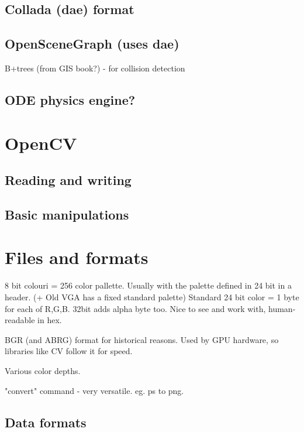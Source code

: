 \documentclass[oneside,english]{scrbook}
\begin{document}
\section{Collada (dae) format}


\section{OpenSceneGraph (uses dae)}
B+trees (from GIS book?) - for collision detection

\section{ODE physics engine?}

\chapter{OpenCV}


\section{Reading and writing}




\section{Basic manipulations}


\chapter{Files and formats}

8 bit colouri = 256 color pallette. Usually with the palette defined in 24 bit in a header. (+ Old VGA has a fixed standard palette)
Standard 24 bit color = 1 byte for each of R,G,B. 32bit adds alpha byte too.  Nice to see and work with, human-readable in hex.

BGR (and ABRG) format for historical reasons. Used by GPU hardware, so libraries like CV follow it for speed.

Various color depths.

"convert" command - very versatile. eg. ps to png.


\section{Data formats}
\end{document}
